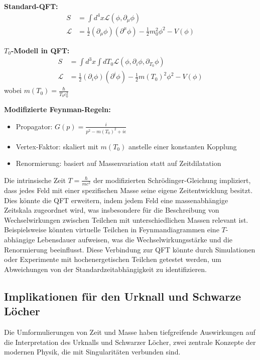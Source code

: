 \documentclass[a4paper,12pt]{article}
\begin{document}
	\begin{tcolorbox}[colback=yellow!5!white,colframe=yellow!75!black,title=Umformulierung von QFT-Konzepten]
		\textbf{Standard-QFT:}
		\begin{align}
			S &= \int d^4x \mathcal{L}(\phi, \partial_\mu\phi) \\
			\mathcal{L} &= \frac{1}{2}(\partial_\mu\phi)(\partial^\mu\phi) - \frac{1}{2}m_0^2\phi^2 - V(\phi)
		\end{align}
		
		\textbf{$T_0$-Modell in QFT:}
		\begin{align}
			S &= \int d^3x \int dT_0 \mathcal{L}(\phi, \partial_i\phi, \partial_{T_0}\phi) \\
			\mathcal{L} &= \frac{1}{2}(\partial_i\phi)(\partial^i\phi) - \frac{1}{2}m(T_0)^2\phi^2 - V(\phi)
		\end{align}
		wobei $m(T_0) = \frac{\hbar}{T_0 c_0^2}$
		
		\textbf{Modifizierte Feynman-Regeln:}
		\begin{itemize}
			\item Propagator: $G(p) = \frac{i}{p^2 - m(T_0)^2 + i\epsilon}$
			\item Vertex-Faktor: skaliert mit $m(T_0)$ anstelle einer konstanten Kopplung
			\item Renormierung: basiert auf Massenvariation statt auf Zeitdilatation
		\end{itemize}
	\end{tcolorbox}
	
	Die intrinsische Zeit \( T = \frac{\hbar}{m c^2} \) der modifizierten Schrödinger-Gleichung impliziert, dass jedes Feld mit einer spezifischen Masse seine eigene Zeitentwicklung besitzt. Dies könnte die QFT erweitern, indem jedem Feld eine massenabhängige Zeitskala zugeordnet wird, was insbesondere für die Beschreibung von Wechselwirkungen zwischen Teilchen mit unterschiedlichen Massen relevant ist. Beispielsweise könnten virtuelle Teilchen in Feynmandiagrammen eine \( T \)-abhängige Lebensdauer aufweisen, was die Wechselwirkungsstärke und die Renormierung beeinflusst. Diese Verbindung zur QFT könnte durch Simulationen oder Experimente mit hochenergetischen Teilchen getestet werden, um Abweichungen von der Standardzeitabhängigkeit zu identifizieren.
	
	\subsection{Implikationen für den Urknall und Schwarze Löcher}
	Die Umformulierungen von Zeit und Masse haben tiefgreifende Auswirkungen auf die Interpretation des Urknalls und Schwarzer Löcher, zwei zentrale Konzepte der modernen Physik, die mit Singularitäten verbunden sind.
	
\end{document}
